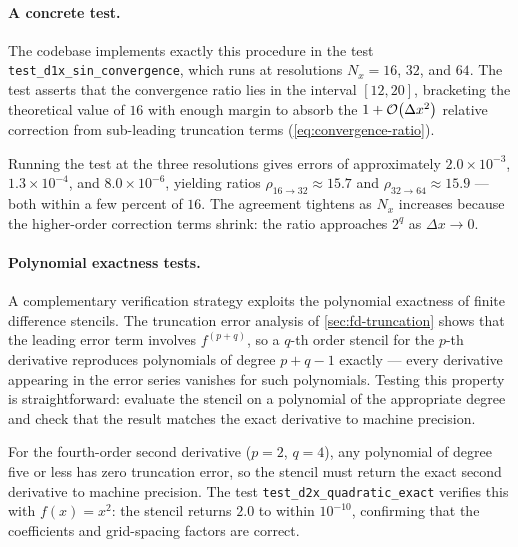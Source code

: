 \paragraph{A concrete test.}

The codebase implements exactly this procedure in the test
\texttt{test\_d1x\_sin\_convergence}, which runs at resolutions
$N_x = 16$, $32$, and $64$.  The test
asserts that the convergence ratio lies in the interval $[12, 20]$,
bracketing the theoretical value of $16$ with enough margin to absorb the
$1 + \mathcal{O}\!\left(\Delta x^2\right)$ relative correction from sub-leading truncation
terms (\cref{eq:convergence-ratio}).

Running the test at the three resolutions gives errors of approximately
$2.0 \times 10^{-3}$, $1.3 \times 10^{-4}$, and $8.0 \times 10^{-6}$,
yielding ratios $\rho_{16 \to 32} \approx 15.7$ and
$\rho_{32 \to 64} \approx 15.9$ --- both within a few percent of $16$.
The agreement tightens as $N_x$ increases because the higher-order
correction terms shrink: the ratio approaches $2^q$ as
$\Delta x \to 0$.

\paragraph{Polynomial exactness tests.}

A complementary verification strategy exploits the polynomial exactness
of finite difference stencils.  The truncation error analysis of
\cref{sec:fd-truncation} shows that the leading error term involves
$f^{(p+q)}$, so a $q$-th order stencil for the $p$-th derivative
reproduces polynomials of degree $p + q - 1$ exactly --- every derivative
appearing in the error series vanishes for such polynomials.  Testing
this property is straightforward: evaluate the stencil on a polynomial
of the appropriate degree and check that the result matches the exact
derivative to machine precision.

For the fourth-order second derivative ($p = 2$, $q = 4$), any polynomial
of degree five or less has zero truncation error, so the stencil must
return the exact second derivative to machine precision.  The test
\texttt{test\_d2x\_quadratic\_exact} verifies this with $f(x) = x^2$:
the stencil returns $2.0$ to within $10^{-10}$, confirming that the
coefficients and grid-spacing factors are correct.

